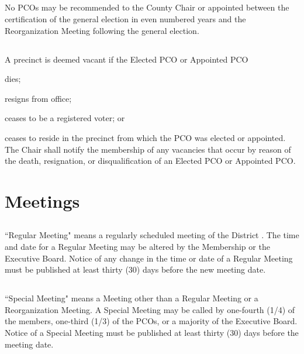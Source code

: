 \subsection{}
No PCOs may be recommended to the County Chair or appointed between the certification of the general election in even numbered years and the Reorganization Meeting following the general election.

\subsection{}
A precinct is deemed vacant if the Elected PCO or Appointed PCO
\begin{inlinealphalist}
    \item dies;
    \item resigns from office;
    \item ceases to be a registered voter; or
    \item ceases to reside in the precinct from which the PCO was elected or appointed. The Chair shall notify the membership of any vacancies that occur by reason of the death, resignation, or disqualification of an Elected PCO or Appointed PCO.
\end{inlinealphalist}

\section{Meetings}
\subsection{} \label{regular-meeting}
``Regular Meeting" means a regularly scheduled meeting of the \fortythird{} District . The time and date for a Regular Meeting may be altered by the Membership or the Executive Board. Notice of any change in the time or date of a Regular Meeting must be published at least thirty (30) days before the new meeting date.

\subsection{} \label{special-meeting}
``Special Meeting" means a Meeting other than a Regular Meeting or a Reorganization Meeting. A Special Meeting may be called by one-fourth (1/4) of the members, one-third (1/3) of the PCOs, or a majority of the Executive Board. Notice of a Special Meeting must be published at least thirty (30) days before the meeting date.

